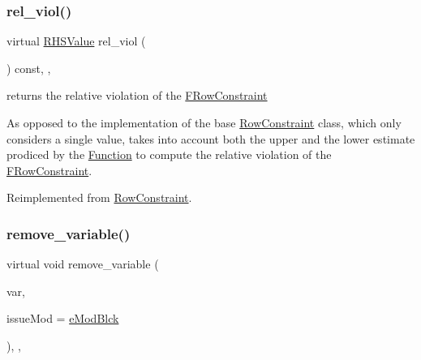 \subsubsection{\texorpdfstring{rel\+\_\+viol()}{rel\_viol()}}
{\footnotesize\ttfamily virtual \mbox{\hyperlink{class_s_m_spp__di__unipi__it_1_1_row_constraint_a8813536ab3b13a81c8e83a999ade3bd8}{R\+H\+S\+Value}} rel\+\_\+viol (\begin{DoxyParamCaption}\item[{void}]{ }\end{DoxyParamCaption}) const\hspace{0.3cm}{\ttfamily [inline]}, {\ttfamily [override]}, {\ttfamily [virtual]}}



returns the relative violation of the \mbox{\hyperlink{class_s_m_spp__di__unipi__it_1_1_f_row_constraint}{F\+Row\+Constraint}} 

As opposed to the implementation of the base \mbox{\hyperlink{class_s_m_spp__di__unipi__it_1_1_row_constraint}{Row\+Constraint}} class, which only considers a single value, takes into account both the upper and the lower estimate prodiced by the \mbox{\hyperlink{class_s_m_spp__di__unipi__it_1_1_function}{Function}} to compute the relative violation of the \mbox{\hyperlink{class_s_m_spp__di__unipi__it_1_1_f_row_constraint}{F\+Row\+Constraint}}. 

Reimplemented from \mbox{\hyperlink{class_s_m_spp__di__unipi__it_1_1_row_constraint_ab62e87cff922e3aa37b8a0b5644b4ecc}{Row\+Constraint}}.

\mbox{\label{class_s_m_spp__di__unipi__it_1_1_f_row_constraint_ade52d9ebf47de895377b860ef4d3a607}} 
\subsubsection{\texorpdfstring{remove\+\_\+variable()}{remove\_variable()}}
{\footnotesize\ttfamily virtual void remove\+\_\+variable (\begin{DoxyParamCaption}\item[{\mbox{\hyperlink{class_s_m_spp__di__unipi__it_1_1_variable}{Variable}} $\ast$}]{var,  }\item[{\mbox{\hyperlink{group___modification___t_y_p_e_s_ga544246d8c462e9a2d817c2c30797968f}{c\+\_\+\+Mod\+Param}}}]{issue\+Mod = {\ttfamily \mbox{\hyperlink{group___modification___t_y_p_e_s_gga48fddcdd03a03f49b7e389ca1ed938d4a21b14b26b1c0093a0905f6fc010bad29}{e\+Mod\+Blck}}} }\end{DoxyParamCaption})\hspace{0.3cm}{\ttfamily [inline]}, {\ttfamily [override]}, {\ttfamily [virtual]}}



